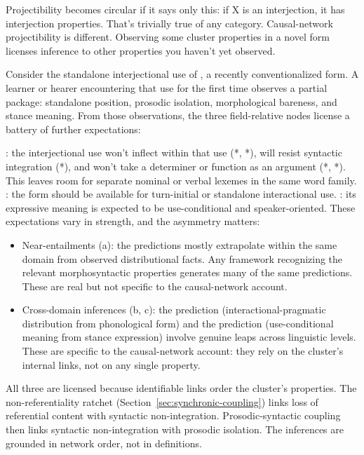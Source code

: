\documentclass[12pt]{article}
\begin{document}
Projectibility becomes circular if it says only this: if X is an
interjection, it has interjection properties. That's trivially true of
any category. Causal-network projectibility is different. Observing some
cluster properties in a novel form licenses inference to other
properties you haven't yet observed.

Consider the standalone interjectional use of , a
recently conventionalized form. A learner or hearer encountering that
use for the first time observes a partial package: standalone position,
prosodic isolation, morphological bareness, and stance meaning. From
those observations, the three field-relative nodes license a battery of
further expectations:

\ea\label{ex:bruh}
  \ea {}: the interjectional use
    won't inflect within that use (*, *),
    will resist syntactic integration (*), and won't take a determiner or function as an argument
    (*, *). This leaves
    room for separate nominal or verbal lexemes in the same word family.
  \ex {}: the form should be available for
    turn-initial or standalone interactional use.
  \ex {}: its expressive meaning is
    expected to be use-conditional and speaker-oriented.
  \z
\z
These expectations vary in strength, and the asymmetry matters:

\begin{itemize}
\item Near-entailments (a): the
   predictions mostly extrapolate
  within the same domain from observed distributional facts. Any
  framework recognizing the relevant morphosyntactic properties
  generates many of the same predictions. These are real but not specific
  to the causal-network account.
\item Cross-domain inferences (b, c): the
   prediction (interactional-pragmatic
  distribution from phonological form) and the
   prediction (use-conditional meaning
  from stance expression) involve genuine leaps across linguistic
  levels. These are specific to the causal-network account: they rely on
  the cluster's internal links, not on any single property.
\end{itemize}
All three are licensed because identifiable links order the cluster's
properties. The non-referentiality ratchet
(Section~\ref{sec:synchronic-coupling}) links loss of referential content with
syntactic non-integration. Prosodic-syntactic coupling then links
syntactic non-integration with prosodic isolation. The inferences are
grounded in network order, not in definitions.
\end{document}
